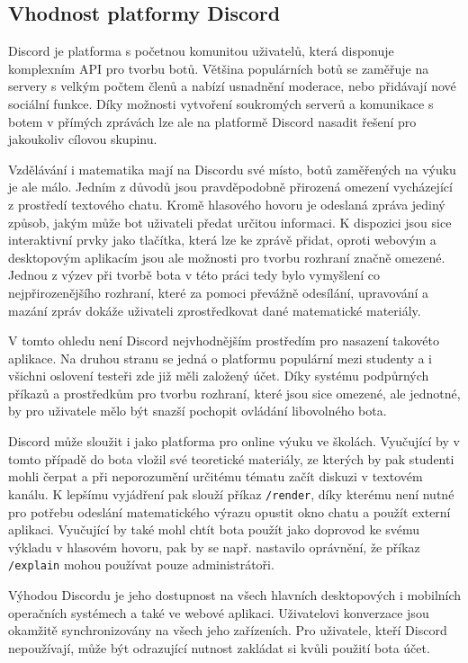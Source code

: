 \documentclass[FM]{tulthesis}
\begin{document}
	\subsection{Vhodnost platformy Discord}
	
	Discord je platforma s početnou komunitou uživatelů, která disponuje komplexním API pro tvorbu botů. Většina populárních botů se zaměřuje na servery s velkým počtem členů a nabízí usnadnění moderace, nebo přidávají nové sociální funkce. Díky možnosti vytvoření soukromých serverů a komunikace s botem v přímých zprávách lze ale na platformě Discord nasadit řešení pro jakoukoliv cílovou skupinu.
	
	Vzdělávání i matematika mají na Discordu své místo, botů zaměřených na výuku je ale málo. Jedním z důvodů jsou pravděpodobně přirozená omezení vycházející z prostředí textového chatu. Kromě hlasového hovoru je odeslaná zpráva jediný způsob, jakým může bot uživateli předat určitou informaci. K dispozici jsou sice interaktivní prvky jako tlačítka, která lze ke zprávě přidat, oproti webovým a desktopovým aplikacím jsou ale možnosti pro tvorbu rozhraní značně omezené. Jednou z výzev při tvorbě bota v této práci tedy bylo vymyšlení co nejpřirozenějšího rozhraní, které za pomoci převážně odesílání, upravování a mazání zpráv dokáže uživateli zprostředkovat dané matematické materiály.
	
	V tomto ohledu není Discord nejvhodnějším prostředím pro nasazení takovéto aplikace. Na druhou stranu se jedná o platformu populární mezi studenty a i všichni oslovení testeři zde již měli založený účet. Díky systému podpůrných příkazů a prostředkům pro tvorbu rozhraní, které jsou sice omezené, ale jednotné, by pro uživatele mělo být snazší pochopit ovládání libovolného bota.
	
	Discord může sloužit i jako platforma pro online výuku ve školách. Vyučující by v tomto případě do bota vložil své teoretické materiály, ze kterých by pak studenti mohli čerpat a při neporozumění určitému tématu začít diskuzi v textovém kanálu. K lepšímu vyjádření pak slouží příkaz \verb|/render|, díky kterému není nutné pro potřebu odeslání matematického výrazu opustit okno chatu a použít externí aplikaci. Vyučující by také mohl chtít bota použít jako doprovod ke svému výkladu v hlasovém hovoru, pak by se např. nastavilo oprávnění, že příkaz \verb|/explain| mohou používat pouze administrátoři.
	
	Výhodou Discordu je jeho dostupnost na všech hlavních desktopových i mobilních operačních systémech a také ve webové aplikaci. Uživatelovi konverzace jsou okamžitě synchronizovány na všech jeho zařízeních. Pro uživatele, kteří Discord nepoužívají, může být odrazující nutnost zakládat si kvůli použití bota účet.
	
\end{document}
